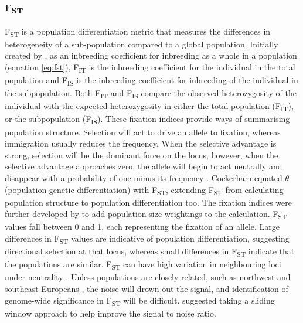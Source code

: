 \documentclass[twoside,openright]{report}
\begin{document}
\subsubsection{\texorpdfstring{F\textsubscript{ST}}{FST}}\label{fst}

F\textsubscript{ST} is a population differentiation metric that measures
the differences in heterogeneity of a sub-population compared to a
global population. Initially created by \citet{Wright1951}, as an
inbreeding coefficient for inbreeding as a whole in a population
(equation \eqref{eq:fst}), F\textsubscript{IT} is the inbreeding
coefficient for the individual in the total population and
F\textsubscript{IS} is the inbreeding coefficient for inbreeding of the
individual in the subpopulation. Both F\textsubscript{IT} and
F\textsubscript{IS} compare the observed heterozygosity of the
individual with the expected heterozygosity in either the total
population (F\textsubscript{IT}), or the subpopulation
(F\textsubscript{IS}). These fixation indices provide ways of
summarising population structure. Selection will act to drive an allele
to fixation, whereas immigration usually reduces the frequency. When the
selective advantage is strong, selection will be the dominant force on
the locus, however, when the selective advantage approaches zero, the
allele will begin to act neutrally and disappear with a probability of
one minus its frequency \citep{kimura_genetic_1968}. Cockerham
\citetext{\citeyear{Cockerham1969}; \citeyear{Cockerham1973}} equated
\(\theta\) (population genetic differentiation) with
F\textsubscript{ST}, extending F\textsubscript{ST} from calculating
population structure to population differentiation too. The fixation
indices were further developed by \citet{Weir1984} to add population
size weightings to the calculation. F\textsubscript{ST} values fall
between 0 and 1, each representing the fixation of an allele. Large
differences in F\textsubscript{ST} values are indicative of population
differentiation, suggesting directional selection at that locus, whereas
small differences in F\textsubscript{ST} indicate that the populations
are similar. F\textsubscript{ST} can have high variation in neighbouring
loci under neutrality \citep{Weir2005}. Unless populations are closely
related, such as northwest and southeast Europeans \citep{Price2008a},
the noise will drown out the signal, and identification of genome-wide
significance in F\textsubscript{ST} will be difficult. \citet{Weir2005}
suggested taking a sliding window approach to help improve the signal to
noise ratio.
\end{document}
